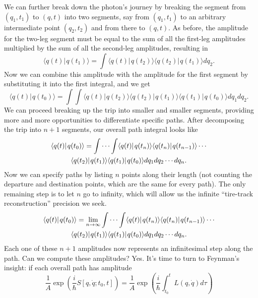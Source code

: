 \documentclass{amsart}
\newcommand{\md}{d}		%
\newcommand{\ket}[1]{\vert \hspace{1pt}#1\rangle}
\newcommand{\braket}[2]{\langle #1 \ket{#2}}
\newcommand{\qv}{q}
\newcommand{\action}[3]{S[#1,\dot{#1};#2,#3]}
\begin{document}
We can further break down the photon's journey by breaking the segment from $(\qv_1,t_1)$ to $(\qv,t)$ into two segments, say from $(\qv_1,t_1)$ to an arbitrary intermediate point $(\qv_2,t_2)$ and from there to $(\qv,t)$.  As before, the amplitude for the two-leg segment must be equal to the sum of all the first-leg amplitudes multiplied by the sum of all the second-leg amplitudes, resulting in
\begin{equation*}
\braket{\qv(t)}{\qv(t_1)} = \int \braket{\qv(t)}{\qv(t_2)}\braket{\qv(t_2)}{\qv(t_1)} \md \qv_2.
\end{equation*}
Now we can combine this amplitude with the amplitude for the first segment by substituting it into the first integral, and we get
\begin{equation*}
\braket{\qv(t)}{\qv(t_0)} = \int \int \braket{\qv(t)}{\qv(t_2)}\braket{\qv(t_2)}{\qv(t_1)}\braket{\qv(t_1)}{\qv(t_0)} \md \qv_1 \md \qv_2.
\end{equation*}
We can proceed breaking up the trip into smaller and smaller segments, providing more and more opportunities to differentiate specific paths.  After decomposing the trip into $n+1$ segments, our overall path integral looks like
\begin{multline*}
\braket{\qv(t)}{\qv(t_0)} = \idotsint \braket{\qv(t)}{\qv(t_n)} \braket{\qv(t_n)}{\qv(t_{n-1})} \cdots\\ \braket{\qv(t_2)}{\qv(t_1)}\braket{\qv(t_1)}{\qv(t_0)} \md \qv_1 \md \qv_2 \cdots \md \qv_n.
\end{multline*}
Now we can specify paths by listing $n$ points along their length (not counting the departure and destination points, which are the same for every path).  The only remaining step is to let $n$ go to infinity, which will allow us the infinite ``tire-track reconstruction'' precision we seek.
\begin{multline*}
\braket{\qv(t)}{\qv(t_0)} = \lim_{n\rightarrow\infty} \idotsint \braket{\qv(t)}{\qv(t_n)} \braket{\qv(t_n)}{\qv(t_{n-1})} \cdots\\ \braket{\qv(t_2)}{\qv(t_1)}\braket{\qv(t_1)}{\qv(t_0)} \md \qv_1 \md \qv_2 \cdots \md \qv_n.
\end{multline*}
Each one of these $n+1$ amplitudes now represents an infinitesimal step along the path.  Can we compute these amplitudes?  Yes.  It's time to turn to Feynman's insight: if each overall path has amplitude
\begin{equation*}
\frac{1}{A} \exp{\left(\frac{i}{\hbar}\action{\qv}{t_0}{t}\right)} = \frac{1}{A} \exp{\left(\frac{i}{\hbar}\int_{t_0}^{t} L(\qv,\dot{\qv}) \md \tau \right)}
\end{equation*}
\end{document}
